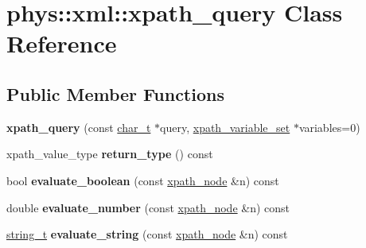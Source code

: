 \hypertarget{classphys_1_1xml_1_1xpath__query}{
\section{phys::xml::xpath\_\-query Class Reference}
\label{de/d9e/classphys_1_1xml_1_1xpath__query}
}
\subsection*{Public Member Functions}
\begin{DoxyCompactItemize}
\item 
\hypertarget{classphys_1_1xml_1_1xpath__query_ac46d4ff6f40637d5a4d0a2069f340ee1}{
{\bfseries xpath\_\-query} (const \hyperlink{namespacephys_1_1xml_afc87705cd1c2917d87b879715a2d8f6e}{char\_\-t} $\ast$query, \hyperlink{classphys_1_1xml_1_1xpath__variable__set}{xpath\_\-variable\_\-set} $\ast$variables=0)}
\label{de/d9e/classphys_1_1xml_1_1xpath__query_ac46d4ff6f40637d5a4d0a2069f340ee1}

\item 
\hypertarget{classphys_1_1xml_1_1xpath__query_a8608ffaa93cb84bea6b64a14c7af8740}{
xpath\_\-value\_\-type {\bfseries return\_\-type} () const }
\label{de/d9e/classphys_1_1xml_1_1xpath__query_a8608ffaa93cb84bea6b64a14c7af8740}

\item 
\hypertarget{classphys_1_1xml_1_1xpath__query_a9c77ca350afe9d4ca792b85f1aff8972}{
bool {\bfseries evaluate\_\-boolean} (const \hyperlink{classphys_1_1xml_1_1xpath__node}{xpath\_\-node} \&n) const }
\label{de/d9e/classphys_1_1xml_1_1xpath__query_a9c77ca350afe9d4ca792b85f1aff8972}

\item 
\hypertarget{classphys_1_1xml_1_1xpath__query_add3ce64b470ba4501cc138d26dfc04ff}{
double {\bfseries evaluate\_\-number} (const \hyperlink{classphys_1_1xml_1_1xpath__node}{xpath\_\-node} \&n) const }
\label{de/d9e/classphys_1_1xml_1_1xpath__query_add3ce64b470ba4501cc138d26dfc04ff}

\item 
\hypertarget{classphys_1_1xml_1_1xpath__query_a050de5645c30898e1fbc4eb3cef8155a}{
\hyperlink{namespacephys_1_1xml_a6db751f2b35502e04c123bb70daa0d20}{string\_\-t} {\bfseries evaluate\_\-string} (const \hyperlink{classphys_1_1xml_1_1xpath__node}{xpath\_\-node} \&n) const }
\label{de/d9e/classphys_1_1xml_1_1xpath__query_a050de5645c30898e1fbc4eb3cef8155a}


\end{DoxyCompactItemize}
